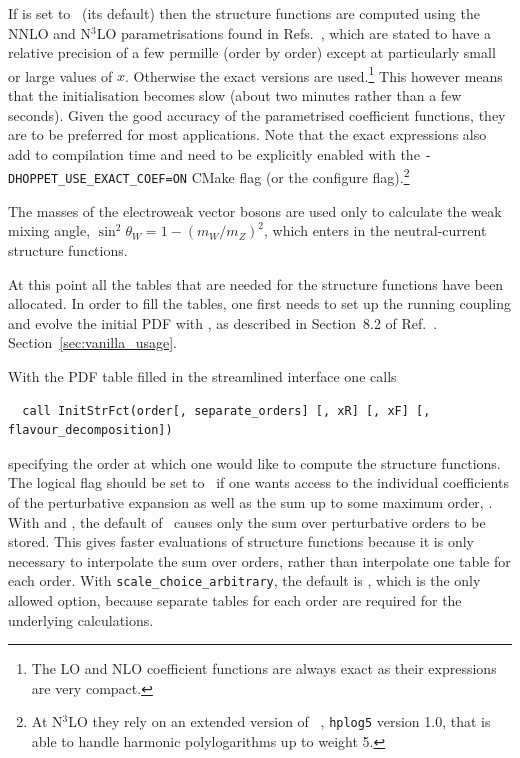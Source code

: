 If  is set to \ (its default) then the
structure functions are computed using the NNLO and N$^3$LO
parametrisations found in
Refs.~\cite{vanNeerven:1999ca,vanNeerven:2000uj,Moch:2004xu,Vermaseren:2005qc,Moch:2008fj,Davies:2016ruz},
which are stated to have a relative precision of a few permille (order
by order) except at particularly small or large values of $x$.
%
Otherwise
the exact versions are used.\footnote{The LO and NLO coefficient
functions are always exact as their expressions are very
compact.}
%
This however means that the initialisation becomes slow (about two
minutes rather than a few seconds).
%
Given the good accuracy of the parametrised coefficient functions,
they are to be preferred for most applications.
% 
% 
Note that the exact expressions also add to compilation time and need
to be explicitly enabled with the \texttt{-DHOPPET\_USE\_EXACT\_COEF=ON}
CMake flag (or the  configure
flag).\footnote{At N$^3$LO they rely on an extended version of
  ~\cite{FortranPolyLog}, \texttt{hplog5} version 1.0, that
  is able to handle harmonic polylogarithms up to weight 5.}

The masses of the electroweak vector bosons are used only to calculate
the weak mixing angle, $\sin^2 \theta_W = 1 - (m_W/m_Z)^2$, which
enters in the neutral-current structure functions.

At this point all the tables that are needed for the structure
functions have been allocated.
%
In order to fill the tables, one first needs to set up the running
coupling and evolve the initial PDF with , as
described in
\ifreleasenote
Section~8.2 of Ref.~\cite{Salam:2008qg}.
\else
Section~\ref{sec:vanilla_usage}.
\fi

%
%
With the PDF table filled in the streamlined interface one calls
\begin{lstlisting}
  call InitStrFct(order[, separate_orders] [, xR] [, xF] [, flavour_decomposition])
\end{lstlisting}
specifying the order at which one would like to compute the structure
functions.
%
The logical flag  should be set to \ if one
wants access to the individual coefficients of the perturbative
expansion as well as the sum up to some maximum order, .
%
With  and , the
default of \ causes only the sum over perturbative orders
to be stored.
%
This gives faster evaluations of structure functions because it is
only necessary to interpolate the sum over orders, rather than
interpolate one table for each order.
%
With \texttt{scale\_choice\_arbitrary}, the default is ,
which is the only allowed option, because separate tables for each
order are required for the underlying calculations.


